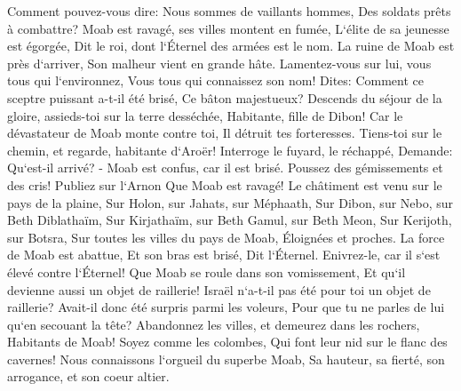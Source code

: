 \verse Comment pouvez-vous dire: Nous sommes de vaillants hommes, Des soldats prêts à combattre? 
\verse Moab est ravagé, ses villes montent en fumée, L`élite de sa jeunesse est égorgée, Dit le roi, dont l`Éternel des armées est le nom. 
\verse La ruine de Moab est près d`arriver, Son malheur vient en grande hâte. 
\verse Lamentez-vous sur lui, vous tous qui l`environnez, Vous tous qui connaissez son nom! Dites: Comment ce sceptre puissant a-t-il été brisé, Ce bâton majestueux? 
\verse Descends du séjour de la gloire, assieds-toi sur la terre desséchée, Habitante, fille de Dibon! Car le dévastateur de Moab monte contre toi, Il détruit tes forteresses. 
\verse Tiens-toi sur le chemin, et regarde, habitante d`Aroër! Interroge le fuyard, le réchappé, Demande: Qu`est-il arrivé? - 
\verse Moab est confus, car il est brisé. Poussez des gémissements et des cris! Publiez sur l`Arnon Que Moab est ravagé! 
\verse Le châtiment est venu sur le pays de la plaine, Sur Holon, sur Jahats, sur Méphaath, 
\verse Sur Dibon, sur Nebo, sur Beth Diblathaïm, 
\verse Sur Kirjathaïm, sur Beth Gamul, sur Beth Meon, 
\verse Sur Kerijoth, sur Botsra, Sur toutes les villes du pays de Moab, Éloignées et proches. 
\verse La force de Moab est abattue, Et son bras est brisé, Dit l`Éternel. 
\verse Enivrez-le, car il s`est élevé contre l`Éternel! Que Moab se roule dans son vomissement, Et qu`il devienne aussi un objet de raillerie! 
\verse Israël n`a-t-il pas été pour toi un objet de raillerie? Avait-il donc été surpris parmi les voleurs, Pour que tu ne parles de lui qu`en secouant la tête? 
\verse Abandonnez les villes, et demeurez dans les rochers, Habitants de Moab! Soyez comme les colombes, Qui font leur nid sur le flanc des cavernes! 
\verse Nous connaissons l`orgueil du superbe Moab, Sa hauteur, sa fierté, son arrogance, et son coeur altier. 

